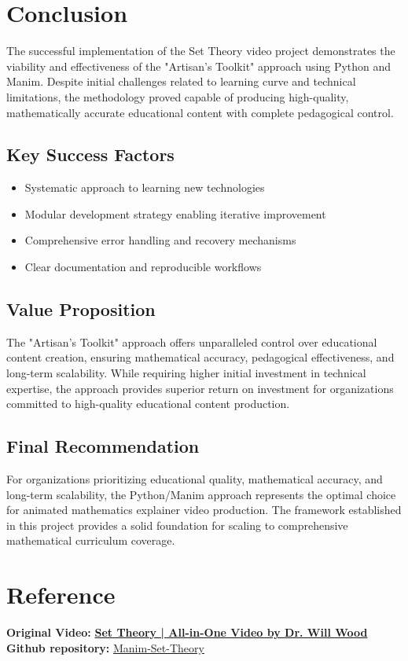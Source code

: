 \documentclass[12pt,a4paper]{article}
\begin{document}
\section{Conclusion}

The successful implementation of the Set Theory video project demonstrates the viability and effectiveness of the "Artisan's Toolkit" approach using Python and Manim. Despite initial challenges related to learning curve and technical limitations, the methodology proved capable of producing high-quality, mathematically accurate educational content with complete pedagogical control.

\subsection{Key Success Factors}
\begin{itemize}
    \item Systematic approach to learning new technologies
    \item Modular development strategy enabling iterative improvement
    \item Comprehensive error handling and recovery mechanisms
    \item Clear documentation and reproducible workflows
\end{itemize}

\subsection{Value Proposition}
The "Artisan's Toolkit" approach offers unparalleled control over educational content creation, ensuring mathematical accuracy, pedagogical effectiveness, and long-term scalability. While requiring higher initial investment in technical expertise, the approach provides superior return on investment for organizations committed to high-quality educational content production.

\subsection{Final Recommendation}
For organizations prioritizing educational quality, mathematical accuracy, and long-term scalability, the Python/Manim approach represents the optimal choice for animated mathematics explainer video production. The framework established in this project provides a solid foundation for scaling to comprehensive mathematical curriculum coverage.

\section{Reference}

\textbf{Original Video:} \href{https://www.youtube.com/watch?v=5ZhNmKb-dqk}{\textbf{Set Theory | All-in-One Video by Dr. Will Wood}}
\textbf{Github repository:} \href{https://github.com/EngineerProjects/Manim-Set-Theory}{Manim-Set-Theory}
\end{document}
